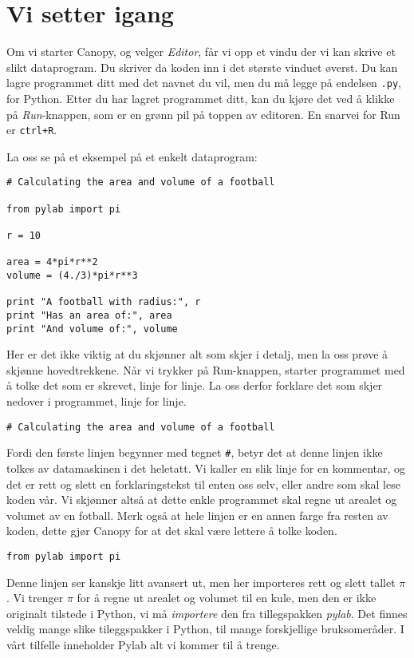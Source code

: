 \documentclass[a4paper, 11pt, notitlepage, english]{article}
\begin{document}
\section*{Vi setter igang}

Om vi starter Canopy, og velger \emph{Editor}, får vi opp et vindu der vi kan skrive et slikt dataprogram. Du skriver da koden inn i det største vinduet øverst. Du kan lagre programmet ditt med det navnet du vil, men du må legge på endelsen \verb+.py+, for Python. Etter du har lagret programmet ditt, kan du kjøre det ved å klikke på \emph{Run}-knappen, som er en grønn pil på toppen av editoren. En snarvei for Run er \verb!ctrl+R!.

La oss se på et eksempel på et enkelt dataprogram:
\begin{lstlisting}
# Calculating the area and volume of a football

from pylab import pi 

r = 10

area = 4*pi*r**2
volume = (4./3)*pi*r**3

print "A football with radius:", r
print "Has an area of:", area 
print "And volume of:", volume
\end{lstlisting}

Her er det ikke viktig at du skjønner alt som skjer i detalj, men la oss prøve å skjønne hovedtrekkene. Når vi trykker på Run-knappen, starter programmet med å tolke det som er skrevet, linje for linje. La oss derfor forklare det som skjer nedover i programmet, linje for linje.

\vspace{0.4cm}
\begin{lstlisting}
# Calculating the area and volume of a football
\end{lstlisting}
\vspace{-0.3cm}
Fordi den første linjen begynner med tegnet \verb+#+, betyr det at denne linjen ikke tolkes av datamaskinen i det heletatt. Vi kaller en slik linje for en kommentar, og det er rett og slett en forklaringstekst til enten oss selv, eller andre som skal lese koden vår. Vi skjønner altså at dette enkle programmet skal regne ut arealet og volumet av en fotball. Merk også at hele linjen er en annen farge fra resten av koden, dette gjør Canopy for at det skal være lettere å tolke koden.

\vspace{0.4cm}
\begin{lstlisting}
from pylab import pi
\end{lstlisting}
\vspace{-0.3cm}
Denne linjen ser kanskje litt avansert ut, men her importeres rett og slett tallet $\pi$. Vi trenger $\pi$ for å regne ut arealet og volumet til en kule, men den er ikke originalt tilstede i Python, vi må \emph{importere} den fra tillegspakken \emph{pylab}. Det finnes veldig mange slike tileggspakker i Python, til mange forskjellige bruksomeråder. I vårt tilfelle inneholder Pylab alt vi kommer til å trenge.
\end{document}
